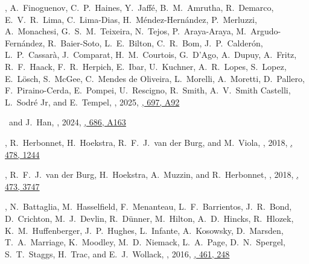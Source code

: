 
\item
\myself, A.~Finoguenov, C.~P.~Haines, Y.~Jaffé, B.~M.~Amrutha, R.~Demarco, E.~V.~R.~Lima, C.~Lima-Dias, H.~Méndez-Hernández, P.~Merluzzi, A.~Monachesi, G.~S.~M.~Teixeira, N.~Tejos, P.~Araya-Araya, M.~Argudo-Fernández, R.~Baier-Soto, L.~E.~Bilton, C.~R.~Bom, J.~P.~Calderón, L.~P.~Cassarà, J.~Comparat, H.~M.~Courtois, G.~D'Ago, A.~Dupuy, A.~Fritz, R.~F.~Haack, F.~R.~Herpich, E.~Ibar, U.~Kuchner, A.~R.~Lopes, S.~Lopez, E.~Lösch, S.~McGee, C.~Mendes de Oliveira, L.~Morelli, A.~Moretti, D.~Pallero, F.~Piraino-Cerda, E.~Pompei, U.~Rescigno, R.~Smith, A.~V.~Smith Castelli, L.~Sodré Jr, and E.~Tempel,
,
2025, \href{https://ui.adsabs.harvard.edu/abs/2025A&A...697..92S}{\aap, 697, A92}

\item
\myself\ and J.~Han,
,
2024, \href{https://ui.adsabs.harvard.edu/abs/2024A&A...686A.163S}{\aap, 686, A163}

\item
\myself, R.~Herbonnet, H.~Hoekstra, R.~F.~J.~van der Burg, and M.~Viola,
,
2018, \href{https://ui.adsabs.harvard.edu/abs/2018MNRAS.478.1244S}{\mnras, 478, 1244}

\item
\myself, R.~F.~J.~van der Burg, H.~Hoekstra, A.~Muzzin, and R.~Herbonnet,
,
2018, \href{https://ui.adsabs.harvard.edu/abs/2018MNRAS.473.3747S}{\mnras, 473, 3747}

\item
\myself, N.~Battaglia, M.~Hasselfield, F.~Menanteau, L.~F.~Barrientos, J.~R.~Bond, D.~Crichton, M.~J.~Devlin, R.~Dünner, M.~Hilton, A.~D.~Hincks, R.~Hlozek, K.~M.~Huffenberger, J.~P.~Hughes, L.~Infante, A.~Kosowsky, D.~Marsden, T.~A.~Marriage, K.~Moodley, M.~D.~Niemack, L.~A.~Page, D.~N.~Spergel, S.~T.~Staggs, H.~Trac, and E.~J.~Wollack,
,
2016, \href{https://ui.adsabs.harvard.edu/abs/2016MNRAS.461..248S}{\mnras, 461, 248}

